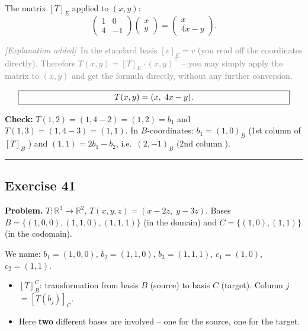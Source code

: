 \documentclass[a4paper,12pt]{article}
\newcommand{\erglerk}{\textcolor{gray}{\small\textit{[Explanation added]}}}
\begin{document}
The matrix $[T]_E$ applied to $(x, y)$:
\[
\begin{pmatrix} 1 & 0 \\ 4 & -1 \end{pmatrix}\begin{pmatrix} x \\ y \end{pmatrix}
= \begin{pmatrix} x \\ 4x - y \end{pmatrix}.
\]

\erglerk\ \textcolor{gray}{\small In the standard basis $[v]_E = v$ (you read off the coordinates directly). Therefore $T(x,y) = [T]_E \cdot (x,y)^\top$ -- you may simply apply the matrix to $(x,y)$ and get the formula directly, without any further conversion.}

\[
\fbox{\parbox{0.93\textwidth}{\centering
$T(x, y) = (x,\; 4x - y)$.
}}
\]

\textbf{Check:} $T(1,2) = (1, 4-2) = (1, 2) = b_1$ and $T(1,3) = (1, 4-3) = (1,1)$.
In $B$-coordinates: $b_1 = (1,0)_B$ (1st column of $[T]_B$ \checkmark) and $(1,1) = 2 b_1 - b_2$, i.e.\ $(2,-1)_B$ (2nd column \checkmark).

\bigskip
\hrule
\bigskip

\subsection*{Exercise 41}

\textbf{Problem.} $T \colon \mathbb{R}^3 \to \mathbb{R}^2$, $T(x, y, z) = (x - 2z,\; y - 3z)$.
Bases $B = \{(1,0,0),(1,1,0),(1,1,1)\}$ (in the domain) and $C = \{(1,0),(1,1)\}$ (in the codomain).

We name: $b_1 = (1,0,0)$, $b_2 = (1,1,0)$, $b_3 = (1,1,1)$, \; $c_1 = (1,0)$, $c_2 = (1,1)$.

\begin{begriffe}
\begin{itemize}[leftmargin=*, nosep]
    \item $[T]_B^C$: transformation from basis $B$ (source) to basis $C$ (target). Column $j$ $= [T(b_j)]_C$.
    \item Here \textbf{two} different bases are involved -- one for the source, one for the target.
\end{itemize}
\end{begriffe}
\end{document}
